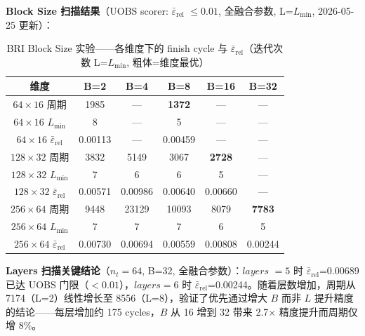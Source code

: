 \documentclass{CjC}
\begin{document}
    \textbf{Block Size 扫描结果}（UOBS scorer: $\bar{\varepsilon}_{\text{rel}}$ $\leq0.01$, 全融合参数,
    L=$L_{\min}$, 2026-05-25 更新）：

    \begin{table}[H]
        \centering
        \caption{BRI Block Size 实验——各维度下的 finish cycle 与 $\bar{\varepsilon}_{\text{rel}}$（迭代次数
        L=$L_{\min}$, 粗体=维度最优）}
        \label{tab:bri-blocksize-extreme}
        \begin{tabular}{c c c c c c}
            \toprule 维度               & B=2     & B=4     & B=8           & B=16          & B=32          \\
            \midrule $64\times16$ 周期  & 1985    & —       & \textbf{1372} & —             & —             \\
            $64\times16$ $L_{\min}$   & 8       & —       & 5             & —             & —             \\
            $64\times16$ $\bar{\varepsilon}_{\text{rel}}$   & 0.00113 & —       & 0.00459       & —             & —             \\
            \midrule $128\times32$ 周期 & 3832    & 5149    & 3067          & \textbf{2728} & —             \\
            $128\times32$ $L_{\min}$  & 7       & 6       & 6             & 5             & —             \\
            $128\times32$ $\bar{\varepsilon}_{\text{rel}}$  & 0.00571 & 0.00986 & 0.00640       & 0.00660       & —             \\
            \midrule $256\times64$ 周期 & 9448    & 23129   & 10093         & 8079          & \textbf{7783} \\
            $256\times64$ $L_{\min}$  & 7       & 7       & 7             & 6             & 5             \\
            $256\times64$ $\bar{\varepsilon}_{\text{rel}}$  & 0.00730 & 0.00694 & 0.00559       & 0.00808       & 0.00244       \\
            \bottomrule
        \end{tabular}
    \end{table}

    \textbf{Layers 扫描关键结论}（$n_{t}=64$, B=32, 全融合参数）：$\textit{layers
    }=5$ 时 $\bar{\varepsilon}_{\text{rel}}$=0.00689 已达 UOBS 门限（$<0.01$），$\textit{layers}=6$ 时
    $\bar{\varepsilon}_{\text{rel}}$=0.00244。随着层数增加，周期从 7174（L=2）线性增长至 8556（L=8），验证了优先通过增大
    $B$ 而非 $L$ 提升精度的结论——每层增加约 175 cycles，$B$ 从 16 增到 32 带来
    2.7$\times$ 精度提升而周期仅增 8\%。
\end{document}
